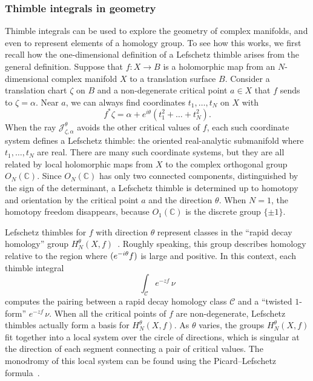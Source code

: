 \documentclass{article}
\let\Re\relax
\DeclareMathOperator{\Re}{Re}
\newcommand{\maps}{\colon}
\newcommand{\C}{\mathbb{C}}
\theoremstyle{definition}
\theoremstyle{plain}
\begin{document}
\subsubsection{Thimble integrals in geometry}
Thimble integrals can be used to explore the geometry of complex manifolds, and even to represent elements of a homology group. To see how this works, we first recall how the one-dimensional definition of a Lefschetz thimble arises from the general definition. Suppose that $f \maps X \to B$ is a holomorphic map from an $N$-dimensional complex manifold $X$ to a translation surface $B$. Consider a translation chart $\zeta$ on $B$ and a non-degenerate critical point $a \in X$ that $f$ sends to $\zeta = \alpha$. Near $a$, we can always find coordinates $t_1, \ldots, t_N$ on $X$ with
\[ f^*\zeta = \alpha + e^{i \theta} (t_1^2 + \ldots + t_N^2). \]
When the ray $\mathcal{J}_{\zeta, \alpha}^\theta$ avoids the other critical values of $f$, each such coordinate system defines a Lefschetz thimble: the oriented real-analytic submanifold where $t_1, \ldots, t_N$ are real. There are many such coordinate systems, but they are all related by local holomorphic maps from $X$ to the complex orthogonal group $O_N(\C)$. Since $O_N(\C)$ has only two connected components, distinguished by the sign of the determinant, a Lefschetz thimble is determined up to homotopy and orientation by the critical point $a$ and the direction $\theta$. When $N = 1$, the homotopy freedom disappears, because $O_1(\C)$ is the discrete group $\{\pm 1\}$.

Lefschetz thimbles for $f$ with direction $\theta$ represent classes in the ``rapid decay homology'' group $H^\theta_N(X,f)$~\cite{pham}\cite[Section~1.1]{fresan-notes}. Roughly speaking, this group describes homology relative to the region where $\Re(e^{-i\theta} f)$ is large and positive. In this context, each thimble integral
\[ \int_{\mathcal{C}}e^{-zf}\,\nu \]
computes the pairing between a rapid decay homology class $\mathcal{C}$ and a ``twisted $1$-form'' $e^{-zf}\,\nu$. When all the critical points of $f$ are non-degenerate, Lefschetz thimbles actually form a basis for $H^\theta_N(X,f)$. As $\theta$ varies, the groups $H^\theta_N(X,f)$ fit together into a local system over the circle of directions, which is singular at the direction of each segment connecting a pair of critical values. The monodromy of this local system can be found using the Picard--Lefschetz formula~\cite[Section~1]{Arnold}\cite[Section~3.3, Part II]{pham}.
\end{document}
